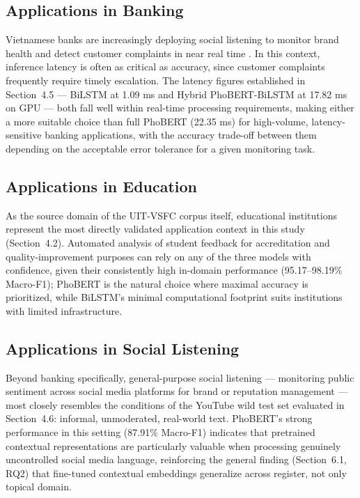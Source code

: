 \documentclass[12pt]{report} %
\begin{document}
\subsection{Applications in Banking}
Vietnamese banks are increasingly deploying social listening to monitor brand health and detect customer complaints in near real time \cite{reputa_2024}. In this context, inference latency is often as critical as accuracy, since customer complaints frequently require timely escalation. The latency figures established in Section~4.5 --- BiLSTM at 1.09 ms and Hybrid PhoBERT-BiLSTM at 17.82 ms on GPU --- both fall well within real-time processing requirements, making either a more suitable choice than full PhoBERT (22.35 ms) for high-volume, latency-sensitive banking applications, with the accuracy trade-off between them depending on the acceptable error tolerance for a given monitoring task.

\subsection{Applications in Education}
As the source domain of the UIT-VSFC corpus itself, educational institutions represent the most directly validated application context in this study (Section~4.2). Automated analysis of student feedback for accreditation and quality-improvement purposes \cite{younet_2023} can rely on any of the three models with confidence, given their consistently high in-domain performance (95.17--98.19\% Macro-F1); PhoBERT is the natural choice where maximal accuracy is prioritized, while BiLSTM's minimal computational footprint suits institutions with limited infrastructure.

\subsection{Applications in Social Listening}
Beyond banking specifically, general-purpose social listening --- monitoring public sentiment across social media platforms for brand or reputation management \cite{younet_2023} --- most closely resembles the conditions of the YouTube wild test set evaluated in Section~4.6: informal, unmoderated, real-world text. PhoBERT's strong performance in this setting (87.91\% Macro-F1) indicates that pretrained contextual representations are particularly valuable when processing genuinely uncontrolled social media language, reinforcing the general finding (Section~6.1, RQ2) that fine-tuned contextual embeddings generalize across register, not only topical domain.
\end{document}
